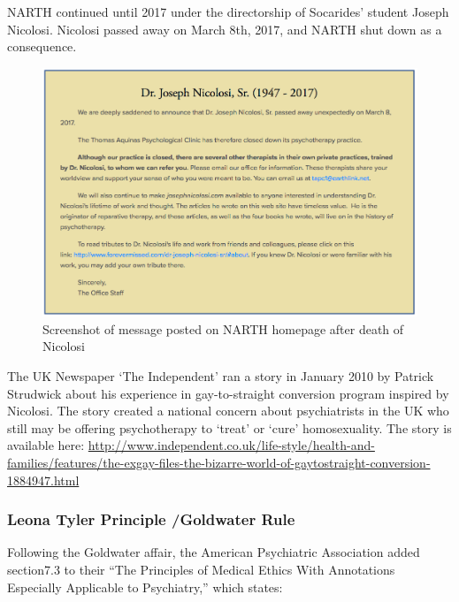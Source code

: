 \begin{refsection}
NARTH continued until 2017 under the directorship of Socarides' student Joseph Nicolosi. Nicolosi passed away on March 8th, 2017, and NARTH shut down as a consequence.

\begin{figure}
 \begin{center}

 
\includegraphics{../images/Nicolosi-Obit-2017.png}
\end{center}
 \caption{Screenshot of message posted on NARTH homepage after death of Nicolosi}
\label{fig: nicolosi}
\end{figure}


The UK Newspaper `The Independent' ran a story in January 2010 by Patrick Strudwick about his experience in gay-to-straight conversion program inspired by Nicolosi. The story created a national concern about psychiatrists in the UK who still may be offering psychotherapy to `treat' or `cure' homosexuality. The story is available here: \url{http://www.independent.co.uk/life-style/health-and-families/features/the-exgay-files-the-bizarre-world-of-gaytostraight-conversion-1884947.html}

\subsubsection{Leona Tyler Principle \slash  Goldwater Rule}
\label{leonatylerprinciplegoldwaterrule}

Following the Goldwater affair, the American Psychiatric Association added section7.3 to their ``The Principles of Medical Ethics With Annotations Especially Applicable to Psychiatry,'' which states:

\begin{quote}


\end{quote}
\end{refsection}
